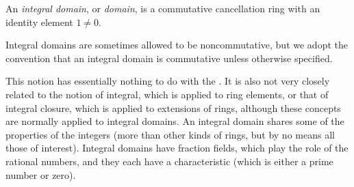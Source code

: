 \documentclass{article}
\begin{document}
An \emph{integral domain}, or \emph{domain}, is a commutative cancellation ring with an identity element $1 \neq 0$.

Integral domains are sometimes allowed to be noncommutative, but we adopt the convention that an integral domain is commutative unless otherwise specified.

This notion has essentially nothing to do with the .  It is also not very closely related to the notion of integral, which is applied to ring elements, or that of integral closure, which is applied to extensions of rings, although these concepts are normally applied to integral domains.  An integral domain shares some of the properties of the integers (more than other kinds of rings, but by no means all those of interest).  Integral domains have fraction fields, which play the role of the rational numbers, and they each have a characteristic (which is either a prime number or zero).
\end{document}
